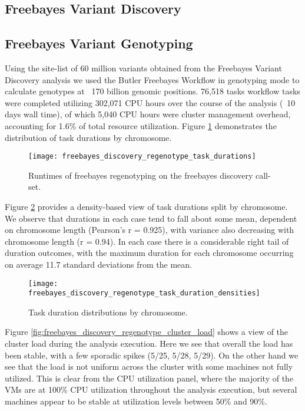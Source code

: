 \subsection{Freebayes Variant Discovery}
\subsection{Freebayes Variant Genotyping}

Using the site-list of 60 million variants obtained from the Freebayes Variant Discovery analysis we used the Butler Freebayes Workflow in genotyping mode to calculate genotypes at ~170 billion genomic positions. 76,518 tasks workflow tasks were completed utilizing 302,071 CPU hours over the course of the analysis (~10 days wall time), of which 5,040 CPU hours were cluster management overhead, accounting for 1.6\% of total resource utilization. Figure  \ref{fig:freebayes_discovery_regenotype_task_durations} demonstrates the distribution of task durations by chromosome.

\begin{figure}[H]
\texttt{[image: freebayes\_discovery\_regenotype\_task\_durations]}
\centering
\caption {Runtimes of freebayes regenotyping on the freebayes discovery call-set.}
\label{fig:freebayes_discovery_regenotype_task_durations}
\end{figure}

Figure \ref{fig:freebayes_discovery_regenotype_task_duration_densities} provides a density-based view of task durations split by chromosome. We observe that durations in each case tend to fall about some mean, dependent on chromosome length (Pearson's r = 0.925), with variance also decreasing with chromosome length (r = 0.94). In each case there is a considerable right tail of duration outcomes, with the maximum duration for each chromosome occurring on average 11.7 standard deviations from the mean.

\begin{figure}[H]
\texttt{[image: freebayes\_discovery\_regenotype\_task\_duration\_densities]}
\centering
\caption {Task duration distributions by chromosome.}
\label{fig:freebayes_discovery_regenotype_task_duration_densities}
\end{figure}

Figure \ref{fig:freebayes_discovery_regenotype_cluster_load} shows a view of the cluster load during the analysis execution. Here we see that overall the load has been stable, with a few sporadic spikes (5/25, 5/28, 5/29). On the other hand we see that the load is not uniform across the cluster with some machines not fully utilized. This is clear from the CPU utilization panel, where the majority of the VMs are at 100\% CPU utilization throughout the analysis execution, but several machines appear to be stable at utilization levels between 50\% and 90\%.

